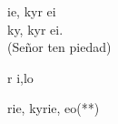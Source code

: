 \documentclass[12pt]{article}
\begin{document}
\begin{multicols*}{2}
\begin{cancion}%
	ie, kyr ei\\
	ky, kyr ei.\\
(Señor ten piedad)\\
\end{cancion}%

\begin{cancion}%
	r i,lo\\
\end{cancion}%

\begin{cancion}%
	rie, kyrie, eo(**)\\
\end{cancion}%


\end{multicols*}
\end{document}
